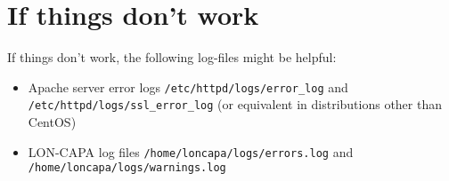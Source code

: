 \section{If things don't work}
If things don't work, the following log-files might be helpful:
\begin{itemize}
\item Apache server error logs {\tt /etc/httpd/logs/error\_log} and {\tt /etc/httpd/logs/ssl\_error\_log} (or equivalent in distributions other than CentOS)
\item LON-CAPA log files {\tt /home/loncapa/logs/errors.log} and {\tt /home/loncapa/logs/warnings.log}
\end{itemize}

